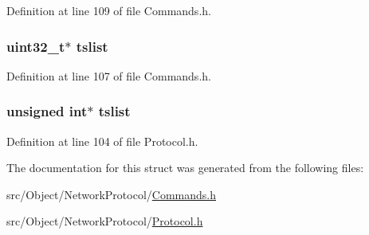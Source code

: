 Definition at line 109 of file Commands.h.

\hypertarget{struct_cmd_addr_a690496cb0763044d995a40b46e8f7d32}{
\subsubsection[{tslist}]{\setlength{\rightskip}{0pt plus 5cm}uint32\_\-t$\ast$ {\bf tslist}}}
\label{struct_cmd_addr_a690496cb0763044d995a40b46e8f7d32}


Definition at line 107 of file Commands.h.

\hypertarget{struct_cmd_addr_af8bd06c27cd9c81c75e60853080e7e7e}{
\subsubsection[{tslist}]{\setlength{\rightskip}{0pt plus 5cm}unsigned int$\ast$ {\bf tslist}}}
\label{struct_cmd_addr_af8bd06c27cd9c81c75e60853080e7e7e}


Definition at line 104 of file Protocol.h.



The documentation for this struct was generated from the following files:\begin{DoxyCompactItemize}
\item 
src/Object/NetworkProtocol/\hyperlink{_commands_8h}{Commands.h}\item 
src/Object/NetworkProtocol/\hyperlink{_protocol_8h}{Protocol.h}\end{DoxyCompactItemize}
